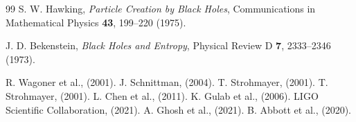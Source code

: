 \documentclass[12pt,a4paper]{article}
\begin{document}
\begin{thebibliography}{99}
		S. W. Hawking, \emph{Particle Creation by Black Holes}, Communications in Mathematical Physics \textbf{43}, 199–220 (1975).
		
		J. D. Bekenstein, \emph{Black Holes and Entropy}, Physical Review D \textbf{7}, 2333–2346 (1973).
		
		 R. Wagoner et al., (2001).
		 J. Schnittman, (2004).
		 T. Strohmayer, (2001).
		 T. Strohmayer, (2001).
		 L. Chen et al., (2011).
		 K. Gulab et al., (2006).
		 LIGO Scientific Collaboration, (2021).
		 A. Ghosh et al., (2021).
		 B. Abbott et al., (2020).
		
	\end{thebibliography}
	
\end{document}
